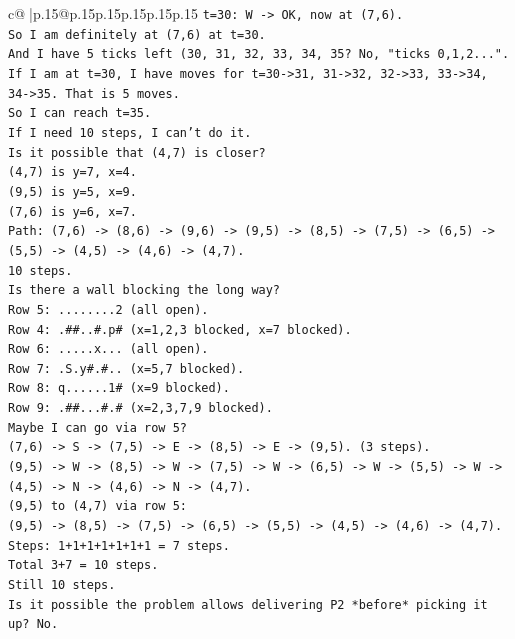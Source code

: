 \documentclass{article}
\begin{document}
{\begin{supertabular}{c@{$\;$}|p{.15\linewidth}@{}p{.15\linewidth}p{.15\linewidth}p{.15\linewidth}p{.15\linewidth}p{.15\linewidth}}
{{{\texttt{t=30: W {-}> OK, now at (7,6).} \\
\texttt{So I am definitely at (7,6) at t=30.} \\
\texttt{And I have 5 ticks left (30, 31, 32, 33, 34, 35? No, "ticks 0,1,2...". If I am at t=30, I have moves for t=30{-}>31, 31{-}>32, 32{-}>33, 33{-}>34, 34{-}>35. That is 5 moves.} \\
\texttt{So I can reach t=35.} \\
\texttt{If I need 10 steps, I can't do it.} \\
\texttt{Is it possible that (4,7) is closer?} \\
\texttt{(4,7) is y=7, x=4.} \\
\texttt{(9,5) is y=5, x=9.} \\
\texttt{(7,6) is y=6, x=7.} \\
\texttt{Path: (7,6) {-}> (8,6) {-}> (9,6) {-}> (9,5) {-}> (8,5) {-}> (7,5) {-}> (6,5) {-}> (5,5) {-}> (4,5) {-}> (4,6) {-}> (4,7).} \\
\texttt{10 steps.} \\
\texttt{Is there a wall blocking the long way?} \\
\texttt{Row 5: ........2 (all open).} \\
\texttt{Row 4: .\#\#..\#.p\# (x=1,2,3 blocked, x=7 blocked).} \\
\texttt{Row 6: .....x... (all open).} \\
\texttt{Row 7: .S.y\#.\#.. (x=5,7 blocked).} \\
\texttt{Row 8: q......1\# (x=9 blocked).} \\
\texttt{Row 9: .\#\#...\#.\# (x=2,3,7,9 blocked).} \\
\texttt{Maybe I can go via row 5?} \\
\texttt{(7,6) {-}> S {-}> (7,5) {-}> E {-}> (8,5) {-}> E {-}> (9,5). (3 steps).} \\
\texttt{(9,5) {-}> W {-}> (8,5) {-}> W {-}> (7,5) {-}> W {-}> (6,5) {-}> W {-}> (5,5) {-}> W {-}> (4,5) {-}> N {-}> (4,6) {-}> N {-}> (4,7).} \\
\texttt{(9,5) to (4,7) via row 5:} \\
\texttt{(9,5) {-}> (8,5) {-}> (7,5) {-}> (6,5) {-}> (5,5) {-}> (4,5) {-}> (4,6) {-}> (4,7).} \\
\texttt{Steps: 1+1+1+1+1+1+1 = 7 steps.} \\
\texttt{Total 3+7 = 10 steps.} \\
\texttt{Still 10 steps.} \\
\texttt{Is it possible the problem allows delivering P2 *before* picking it up? No.} \\
}}}
\end{supertabular}}
\end{document}
